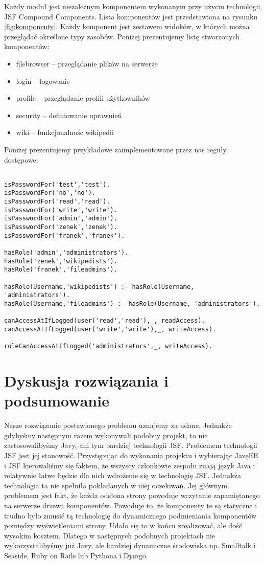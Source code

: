 \documentclass{classrep}
\begin{document}
Każdy moduł jest niezależnym komponentem wykonanym przy użyciu technologii JSF Compound Components.
Lista komponentów jest przedstawiona na rysunku \ref{fig:komponenty}.
Każdy komponent jest zestawem widoków, w których można przeglądać określone typy zasobów.
Poniżej prezentujemy listę stworzonych komponentów:
\begin{itemize}
  \item filebrowser -- przeglądanie plików na serwerze
  \item login -- logowanie
  \item profile -- przeglądanie profili użytkowników
  \item security -- definiowanie uprawnień
  \item wiki -- funkcjonalnośc wikipedii
\end{itemize}
Poniżej prezentujemy przykładowe zaimplementowane przez nas reguły dostępowe:
\begin{verbatim}

isPasswordFor('test','test').
isPasswordFor('no','no').
isPasswordFor('read','read').
isPasswordFor('write','write').
isPasswordFor('admin','admin').
isPasswordFor('zenek','zenek').
isPasswordFor('franek','franek').

hasRole('admin','administrators').
hasRole('zenek','wikipedists').
hasRole('franek','fileadmins').

hasRole(Username,'wikipedists') :- hasRole(Username, 'administrators').
hasRole(Username,'fileadmins') :- hasRole(Username, 'administrators').

canAccessAtIfLogged(user('read','read'),_, readAccess).
canAccessAtIfLogged(user('write','write'),_, writeAccess).

roleCanAccessAtIfLogged('administrators',_, writeAccess).
\end{verbatim}
\section{Dyskusja rozwiązania i podsumowanie}
Nasze rozwiązanie postawionego problemu uznajemy za udane. Jednakże gdybyśmy następnym razem wykonywali podobny projekt, to nie zastosowalibyśmy Javy, ani tym bardziej technologii JSF.
Problemem technologii JSF jest jej stanowość. Przystępując do wykonania projektu i wybierając JavęEE i JSF kierowaliśmy się faktem, że wszyscy członkowie zespołu znają język Java 
i relatywnie łatwe będzie dla nich wdrożenie się w technologię JSF. Jednakża technologia ta nie spełniła pokładanych w niej oczekiwań. Jej głównym problemem jest fakt,
że każda odsłona strony powoduje wczytanie zapamiętanego na serwerze drzewa komponentów. Powoduje to, że komponenty te są statyczne i trudno było zmusić tą technologię do
dynamicznego podmieniania komponentów pomiędzy wyświetleniami strony. Udało się to w końcu zrealizować, ale dość wysokim kosztem. Dlatego w następnych podobnych projektach
nie wykorzystalibyśmy już Javy, ale bardziej dynamiczne środowiska np. Smalltalk i Seaside, Ruby on Rails lub Pythona i Django. 
\end{document}
